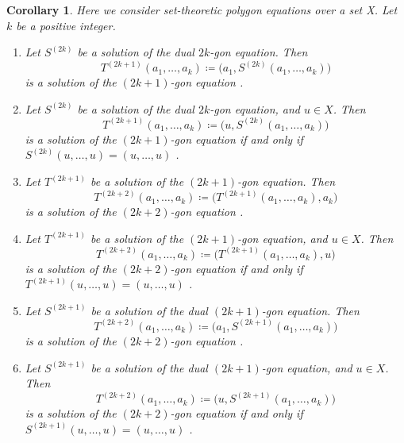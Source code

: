 \documentclass[10pt,a4paper]{amsart}
\numberwithin{equation}{section}
\newtheorem{Corollary}[Theorem]{Corollary}
\theoremstyle{definition}
\begin{document}
\begin{Corollary}
 Here we consider set-theoretic polygon equations over a set X. Let $k$ be a positive integer.
 \begin{enumerate}\itemsep=0pt
 \item[$(1)$] Let $S^{(2k)}$ be a solution of the dual $2k$-gon equation. Then
 \begin{equation*}
 T^{(2k+1)}(a_1,\dots, a_k) \coloneqq \bigl(a_1,S^{(2k)}(a_1,\dots, a_k)\bigr)
 \end{equation*}
 is a solution of the $(2k+1)$-gon equation {\rm \cite[\emph{Conjecture}~7.32]{muller2024structure}}.
 \item[$(2)$] Let $S^{(2k)}$ be a solution of the dual $2k$-gon equation, and $u\in X$. Then
 \begin{equation*}
 T^{(2k+1)}(a_1,\dots, a_k) \coloneqq \bigl(u,S^{(2k)}(a_1,\dots, a_k)\bigr)
 \end{equation*}
 is a solution of the $(2k+1)$-gon equation if and only if $S^{(2k)}(u,\dots, u)=(u,\dots,u)$ {\rm \cite[\emph{Conjecture}~7.33]{muller2024structure}}.
 \item[$(3)$] Let $T^{(2k+1)}$ be a solution of the $(2k+1)$-gon equation. Then
 \begin{equation*}
 T^{(2k+2)}(a_1,\dots, a_k) \coloneqq \bigl(T^{(2k+1)}(a_1,\dots, a_k),a_k\bigr)
 \end{equation*}
 is a solution of the $(2k+2)$-gon equation {\rm \cite[\emph{Conjecture}~7.34]{muller2024structure}}.
 \item[$(4)$] Let $T^{(2k+1)}$ be a solution of the $(2k+1)$-gon equation, and $u\in X$. Then
 \begin{equation*}
 T^{(2k+2)}(a_1,\dots, a_k) \coloneqq \bigl(T^{(2k+1)}(a_1,\dots, a_k),u\bigr)
 \end{equation*}
 is a solution of the $(2k+2)$-gon equation if and only if $T^{(2k+1)}(u,\dots, u)=(u,\dots,u)$ {\rm \cite[\emph{Conjecture}~7.35]{muller2024structure}}.
 \item[$(5)$] Let $S^{(2k+1)}$ be a solution of the dual $(2k+1)$-gon equation. Then
 \begin{equation*}
 T^{(2k+2)}(a_1,\dots, a_k) \coloneqq \bigl(a_1,S^{(2k+1)}(a_1,\dots, a_k)\bigr)
 \end{equation*}
 is a solution of the $(2k+2)$-gon equation {\rm \cite[\emph{Conjecture}~7.36]{muller2024structure}}.
 \item[$(6)$] Let $S^{(2k+1)}$ be a solution of the dual $(2k+1)$-gon equation, and $u\in X$. Then
 \begin{equation*}
 T^{(2k+2)}(a_1,\dots, a_k) \coloneqq \bigl(u,S^{(2k+1)}(a_1,\dots, a_k)\bigr)
 \end{equation*}
 is a solution of the $(2k+2)$-gon equation if and only if $S^{(2k+1)}(u,\dots, u)=(u,\dots,u)$ {\rm \cite[\emph{Conjecture}~7.37]{muller2024structure}}.
 \end{enumerate}
\end{Corollary}
\end{document}
